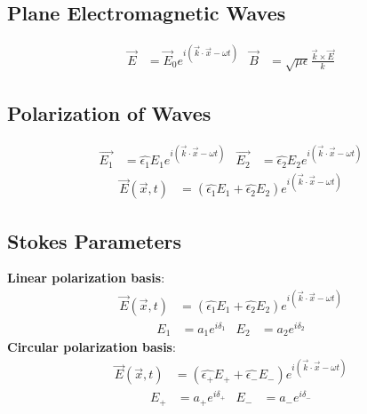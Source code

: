 \documentclass[a4paper, 11pt, landscape]{article}
\begin{document}
\begin{multicols*}{3}
\subsection{Plane Electromagnetic Waves}
\begin{compactenum}
	\begin{align*}
	    \vec{E} &= \vec{E}_{0}e^{i(\vec{k}\cdot\vec{x} - \omega t)} &
	    \vec{B} &= \sqrt{\mu \epsilon}\frac{\vec{k}\times\vec{E}}{k}
	\end{align*}
\end{compactenum}

\subsection{Polarization of Waves}
\begin{compactenum}
	\begin{align*}
	    \vec{E_{1}} &= \hat{\epsilon_{1}}E_{1}e^{i(\vec{k}\cdot\vec{x} - \omega t)}  &
	    \vec{E_{2}} &= \hat{\epsilon_{2}}E_{2}e^{i(\vec{k}\cdot\vec{x} - \omega t)}
	\end{align*}
	\begin{align*}
	    \vec{E}(\vec{x}, t) &= (\hat{\epsilon_{1}}E_{1} + \hat{\epsilon_{2}}E_{2})e^{i(\vec{k}\cdot\vec{x} - \omega t)}   
	\end{align*}
\end{compactenum}

\subsection{Stokes Parameters}
\begin{compactenum}
	\textbf{Linear polarization basis}:
	\begin{align*}
	    \vec{E}(\vec{x}, t) &= (\hat{\epsilon_{1}}E_{1} + \hat{\epsilon_{2}}E_{2})e^{i(\vec{k}\cdot\vec{x} - \omega t)}   
	\end{align*}
	\begin{align*}
	    E_{1} &= a_{1}e^{i\delta_{1}} & E_{2} &= a_{2}e^{i\delta_{2}}
	\end{align*}
	\textbf{Circular polarization basis}:
	\begin{align*}
	    \vec{E}(\vec{x}, t) &= (\hat{\epsilon_{+}}E_{+} +             \hat{\epsilon_{-}}E_{-})e^{i(\vec{k}\cdot\vec{x} - \omega t)}   
	\end{align*}
	\begin{align*}
	    E_{+} &= a_{+}e^{i\delta_{+}} & E_{-} &= a_{-}e^{i\delta_{-}}
	\end{align*}
\end{compactenum}


\end{multicols*}
\end{document}
